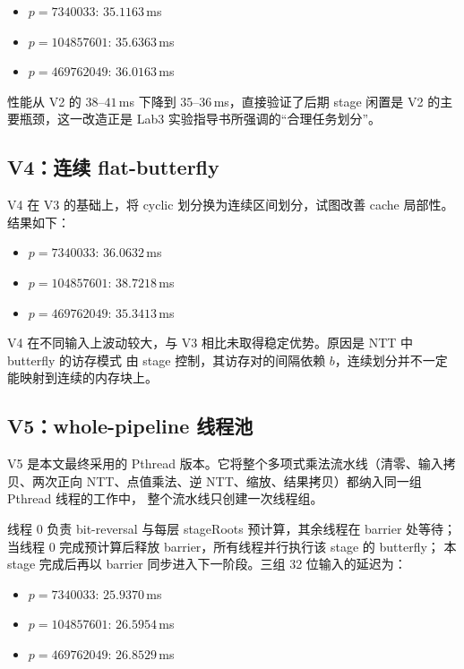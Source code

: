 \documentclass[UTF8,a4paper,10pt]{ctexart}
\begin{document}
\begin{itemize}
  \item $p = 7340033$: $35.1163$\,ms
  \item $p = 104857601$: $35.6363$\,ms
  \item $p = 469762049$: $36.0163$\,ms
\end{itemize}

性能从 V2 的 $38$--$41$\,ms 下降到 $35$--$36$\,ms，直接验证了后期 stage 闲置是
V2 的主要瓶颈，这一改造正是 Lab3 实验指导书所强调的``合理任务划分''。

\subsection{V4：连续 flat-butterfly}

V4 在 V3 的基础上，将 cyclic 划分换为连续区间划分，试图改善 cache 局部性。结果如下：

\begin{itemize}
  \item $p = 7340033$: $36.0632$\,ms
  \item $p = 104857601$: $38.7218$\,ms
  \item $p = 469762049$: $35.3413$\,ms
\end{itemize}

V4 在不同输入上波动较大，与 V3 相比未取得稳定优势。原因是 NTT 中 butterfly 的访存模式
由 stage 控制，其访存对的间隔依赖 $b$，连续划分并不一定能映射到连续的内存块上。

\subsection{V5：whole-pipeline 线程池}

V5 是本文最终采用的 Pthread 版本。它将整个多项式乘法流水线（清零、输入拷贝、两次正向
NTT、点值乘法、逆 NTT、缩放、结果拷贝）都纳入同一组 Pthread 线程的工作中，
整个流水线只创建一次线程组。

线程 0 负责 bit-reversal 与每层 stageRoots 预计算，其余线程在 barrier 处等待；
当线程 0 完成预计算后释放 barrier，所有线程并行执行该 stage 的 butterfly；
本 stage 完成后再以 barrier 同步进入下一阶段。三组 32 位输入的延迟为：

\begin{itemize}
  \item $p = 7340033$: $25.9370$\,ms
  \item $p = 104857601$: $26.5954$\,ms
  \item $p = 469762049$: $26.8529$\,ms
\end{itemize}
\end{document}
